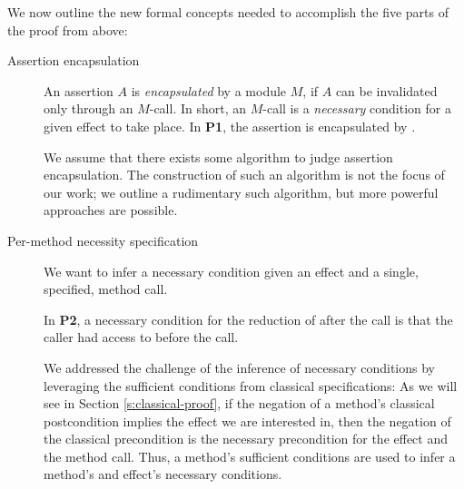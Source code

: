 We  now outline  the new formal concepts needed to accomplish the five parts of the proof from above:

\begin{description}
\item[Assertion encapsulation] %
An assertion $A$  is
\emph{encapsulated} by a module $M$, if  $A$ can be invalidated only through
    an $M$-\internalC call. 
  In short, an $M$-\internalC call is a \emph{necessary} condition for
a given effect to take place.
%
%
In \textbf{P1}, the assertion  is encapsulated by .

We assume that there exists some algorithm to judge assertion encapsulation.
The construction of such an algorithm is not the focus of our work;
  we  outline a rudimentary such algorithm, but more powerful
approaches are possible. 
 

\item[Per-method necessity specification]
  We want to infer
a necessary condition given an effect and
a single, specified, method call. 

In \textbf{P2},   a necessary condition for the  reduction of   after the call  is that the caller had access to  before the call.

We addressed the challenge of the inference of necessary conditions 
 by leveraging the sufficient conditions from classical specifications:
 As we will see in Section \ref{s:classical-proof}, 
if the negation of a method's
 classical postcondition implies  the effect we are interested in, then the negation of the 
 classical precondition  is the necessary precondition for the effect and the method call. Thus, 
  a method's sufficient conditions are used to infer a method's and effect's necessary conditions.




\end{description}
